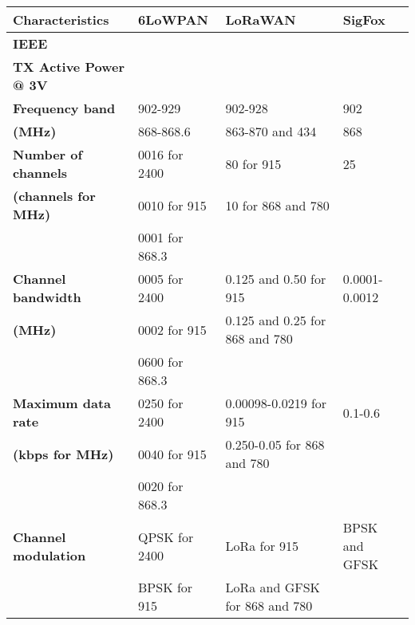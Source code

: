 \begin{table}[h!]
\begin{center}
	\begin{tabular}{l|l|l|l}
	\bf{Characteristics}                           & \bf{6LoWPAN}   & \bf{LoRaWAN}                    & \bf{SigFox}  \\\hline
	\bf{IEEE}                                      &                &                                 &  \\\hline
	\bf{TX Active Power @ 3V}                      &                &                                 &  \\\hline
	\bf{Frequency band}                            & 902-929        & 902-928                         & 902          \\
	\bf{\footnotesize{(MHz)}}                      & 868-868.6      & 863-870 and 434                 & 868          \\\hline
	\bf{Number of channels}                        & 0016 for 2400  & 80             for 915          & 25       \\
	\bf{\footnotesize{(channels for MHz)}}         & 0010 for 915   & 10             for 868 and 780  & \\
	\                                              & 0001 for 868.3 &                                 & \\\hline
	\bf{Channel bandwidth}                         & 0005 for 2400  & 0.125 and 0.50 for 915          & 0.0001-0.0012\\
	\bf{\footnotesize{(MHz)}}                      & 0002 for 915   & 0.125 and 0.25 for 868 and 780  & \\
	\                                              & 0600 for 868.3 &                                 & \\\hline
	\bf{Maximum data rate}                         & 0250 for 2400  & 0.00098-0.0219 for 915          & 0.1-0.6      \\
	\bf{\footnotesize{(kbps for MHz)}}             & 0040 for 915   & 0.250-0.05     for 868 and 780  & \\
	\                                              & 0020 for 868.3 &                                 & \\\hline
	\bf{Channel modulation}                       & QPSK for 2400  & LoRa           for 915          & BPSK and GFSK\\
	\                                             & BPSK for 915   & LoRa and GFSK  for 868  and 780 & \\

\end{tabular}
\end{center}
\end{table}

